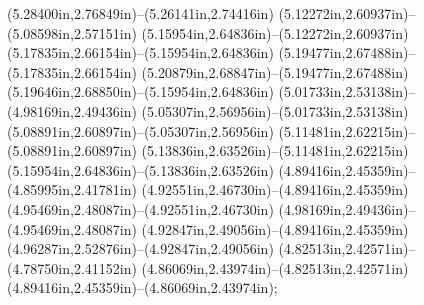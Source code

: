 (5.28400in,2.76849in)--(5.26141in,2.74416in) (5.12272in,2.60937in)--(5.08598in,2.57151in) (5.15954in,2.64836in)--(5.12272in,2.60937in) (5.17835in,2.66154in)--(5.15954in,2.64836in) (5.19477in,2.67488in)--(5.17835in,2.66154in) (5.20879in,2.68847in)--(5.19477in,2.67488in) (5.19646in,2.68850in)--(5.15954in,2.64836in) (5.01733in,2.53138in)--(4.98169in,2.49436in) (5.05307in,2.56956in)--(5.01733in,2.53138in) (5.08891in,2.60897in)--(5.05307in,2.56956in) (5.11481in,2.62215in)--(5.08891in,2.60897in) (5.13836in,2.63526in)--(5.11481in,2.62215in) (5.15954in,2.64836in)--(5.13836in,2.63526in) (4.89416in,2.45359in)--(4.85995in,2.41781in) (4.92551in,2.46730in)--(4.89416in,2.45359in) (4.95469in,2.48087in)--(4.92551in,2.46730in) (4.98169in,2.49436in)--(4.95469in,2.48087in) (4.92847in,2.49056in)--(4.89416in,2.45359in) (4.96287in,2.52876in)--(4.92847in,2.49056in) (4.82513in,2.42571in)--(4.78750in,2.41152in) (4.86069in,2.43974in)--(4.82513in,2.42571in) (4.89416in,2.45359in)--(4.86069in,2.43974in);
